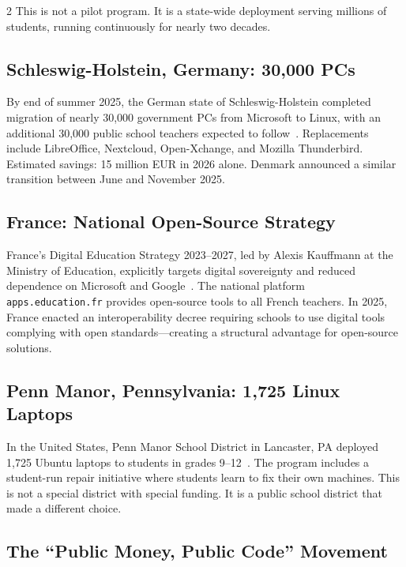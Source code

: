 \documentclass[11pt, a4paper]{article}
\begin{document}
\begin{multicols}{2}
This is not a pilot program. It is a state-wide deployment serving millions of students, running continuously for nearly two decades.

\subsection{Schleswig-Holstein, Germany: 30,000 PCs}

By end of summer 2025, the German state of Schleswig-Holstein completed migration of nearly 30,000 government PCs from Microsoft to Linux, with an additional 30,000 public school teachers expected to follow~\citep{schleswig2025linux}. Replacements include LibreOffice, Nextcloud, Open-Xchange, and Mozilla Thunderbird. Estimated savings: 15 million EUR in 2026 alone. Denmark announced a similar transition between June and November 2025.

\subsection{France: National Open-Source Strategy}

France's Digital Education Strategy 2023--2027, led by Alexis Kauffmann at the Ministry of Education, explicitly targets digital sovereignty and reduced dependence on Microsoft and Google~\citep{france2023digital}. The national platform \texttt{apps.education.fr} provides open-source tools to all French teachers. In 2025, France enacted an interoperability decree requiring schools to use digital tools complying with open standards---creating a structural advantage for open-source solutions.

\subsection{Penn Manor, Pennsylvania: 1,725 Linux Laptops}

In the United States, Penn Manor School District in Lancaster, PA deployed 1,725 Ubuntu laptops to students in grades 9--12~\citep{pennmanor2024linux}. The program includes a student-run repair initiative where students learn to fix their own machines. This is not a special district with special funding. It is a public school district that made a different choice.

\subsection{The ``Public Money, Public Code'' Movement}


\end{multicols}
\end{document}
